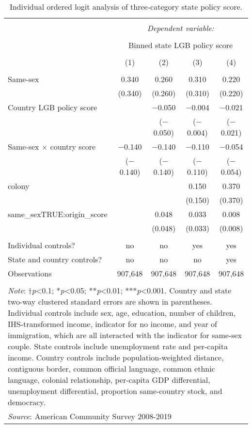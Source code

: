 \documentclass[
  12pt,
]{article}
\begin{document}
\begin{table}[!htbp] \centering 
  \caption{Individual ordered logit analysis of three-category state policy score.} 
  \label{tab:ord} 
\begin{tabular}{@{\extracolsep{5pt}}lcccc} 
\\[-1.8ex]\hline 
\hline \\[-1.8ex] 
 & \multicolumn{4}{c}{\textit{Dependent variable:}} \\ 
\cline{2-5} 
\\[-1.8ex] & \multicolumn{4}{c}{Binned state LGB policy score} \\ 
\\[-1.8ex] & (1) & (2) & (3) & (4)\\ 
\hline \\[-1.8ex] 
 Same-sex & 0.340 & 0.260 & 0.310 & 0.220 \\ 
  & (0.340) & (0.260) & (0.310) & (0.220) \\ 
  Country LGB policy score &  & $-$0.050 & $-$0.004 & $-$0.021 \\ 
  &  & ($-$0.050) & ($-$0.004) & ($-$0.021) \\ 
  Same-sex × country score & $-$0.140 & $-$0.140 & $-$0.110 & $-$0.054 \\ 
  & ($-$0.140) & ($-$0.140) & ($-$0.110) & ($-$0.054) \\ 
  colony &  &  & 0.150 & 0.370 \\ 
  &  &  & (0.150) & (0.370) \\ 
  same\_sexTRUE:origin\_score &  & 0.048 & 0.033 & 0.008 \\ 
  &  & (0.048) & (0.033) & (0.008) \\ 
 \hline \\[-1.8ex] 
Individual controls? & no & no & yes & yes \\ 
State and country controls? & no & no & no & yes \\ 
Observations & 907,648 & 907,648 & 907,648 & 907,648 \\ 
\hline 
\hline \\[-1.8ex] 
\multicolumn{5}{l}{\parbox[t]{.8\textwidth}{\textit{Note}: †\textit{p}<0.1; *\textit{p}<0.05; **\textit{p}<0.01; ***\textit{p}<0.001. Country and state two-way clustered standard errors are shown in parentheses. Individual controls include sex, age, education, number of children, IHS-transformed income, indicator for no income, and year of immigration, which are all interacted with the indicator for same-sex couple. State controls include unemployment rate and per-capita income. Country controls include population-weighted distance, contiguous border, common official language, common ethnic language, colonial relationship, per-capita GDP differential, unemployment differential, proportion same-country stock, and democracy.}} \\ 
\multicolumn{5}{l}{\textit{Source}: American Community Survey 2008-2019} \\ 
\end{tabular} 
\end{table}
\end{document}
